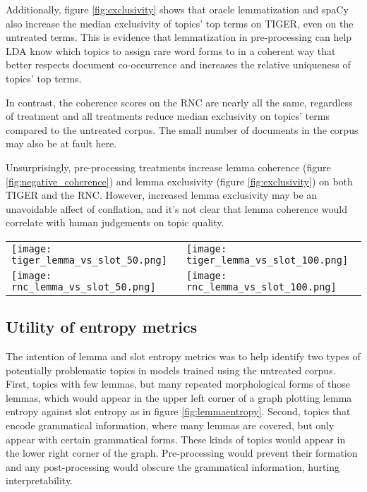 \documentclass[11pt,a4paper]{article}
\begin{document}
Additionally, figure \ref{fig:exclusivity} shows that oracle lemmatization and spaCy also increase the median exclusivity of topics' top terms on TIGER, even on the untreated terms. This is evidence that lemmatization in pre-processing can help LDA know which topics to assign rare word forms to in a coherent way that better respects document co-occurrence and increases the relative uniqueness of topics' top terms.

In contrast, the coherence scores on the RNC are nearly all the same, regardless of treatment and all treatments reduce median exclusivity on topics' terms compared to the untreated corpus. The small number of documents in the corpus may also be at fault here.

Unsurprisingly, pre-processing treatments increase lemma coherence (figure \ref{fig:negative_coherence}) and lemma exclusivity (figure \ref{fig:exclusivity}) on both TIGER and the RNC. However, increased lemma exclusivity  may be an unavoidable affect of conflation, and it's not clear that lemma coherence would correlate with human judgements on topic quality.

\begin{figure*}[t]
    \label{fig:entropymetrics}
    \begin{tabular}{ll}
        \texttt{[image: tiger\_lemma\_vs\_slot\_50.png]} & \texttt{[image: tiger\_lemma\_vs\_slot\_100.png]} \\
        \texttt{[image: rnc\_lemma\_vs\_slot\_50.png]} &
        \texttt{[image: rnc\_lemma\_vs\_slot\_100.png]}
    \end{tabular}
\end{figure*}

\subsection{Utility of entropy metrics}
The intention of lemma and slot entropy metrics was to help identify two types of potentially problematic topics in models trained using the untreated corpus. First, topics with few lemmas, but many repeated morphological forms of those lemmas, which would appear in the upper left corner of a graph plotting lemma entropy against slot entropy as in figure \ref{fig:lemmaentropy}. Second, topics that encode grammatical information, where many lemmas are covered, but only appear with certain grammatical forms. These kinds of topics would appear in the lower right corner of the graph. Pre-processing would prevent their formation and any post-processing would obscure the grammatical information, hurting interpretability.
\end{document}

